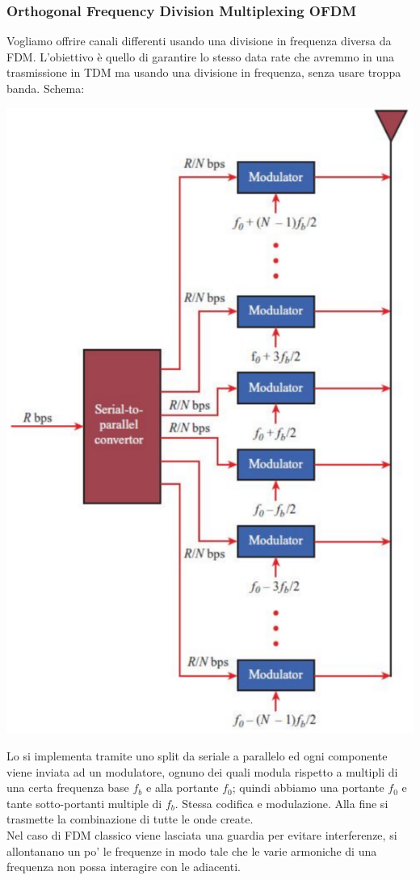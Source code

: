 \newpage

\subsubsection{Orthogonal Frequency Division Multiplexing OFDM}
Vogliamo offrire canali differenti usando una divisione in frequenza diversa da FDM. L'obiettivo è quello di garantire lo stesso data rate che avremmo in una trasmissione in TDM ma usando una divisione in frequenza, senza usare troppa banda. Schema:
\begin{center}
	\includegraphics[width=0.45\linewidth]{img/wireless/OFDM1}
\end{center}
Lo si implementa tramite uno split da seriale a parallelo ed ogni componente viene inviata ad un modulatore, ognuno dei quali modula rispetto a multipli di una certa frequenza base $f_b$ e alla portante $f_0$; quindi abbiamo una portante $f_0$ e tante sotto-portanti multiple di $f_b$. Stessa codifica e modulazione. Alla fine si trasmette la combinazione di tutte le onde create. \\

Nel caso di FDM classico viene lasciata una guardia per evitare interferenze, si allontanano un po' le frequenze in modo tale che le varie armoniche di una frequenza non possa interagire con le adiacenti.\\

\newpage


